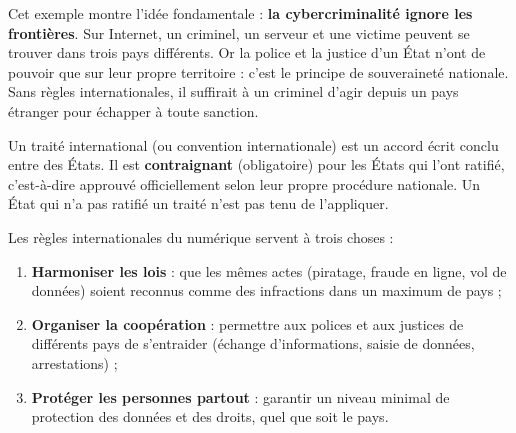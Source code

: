 \documentclass[11pt]{article}
\newcommand{\cle}[1]{{\popxbold\color{popdark}#1}}
\begin{document}
Cet exemple montre l'idée fondamentale : \textbf{la cybercriminalité ignore les frontières}. Sur Internet, un criminel, un serveur et une victime peuvent se trouver dans trois pays différents. Or la police et la justice d'un État n'ont de pouvoir que sur leur propre territoire : c'est le principe de \cle{souveraineté nationale}. Sans règles internationales, il suffirait à un criminel d'agir depuis un pays étranger pour échapper à toute sanction.

\begin{definition}
Un \cle{traité international} (ou \cle{convention internationale}) est un accord écrit conclu entre des États. Il est \textbf{contraignant} (obligatoire) pour les États qui l'ont \cle{ratifié}, c'est-à-dire approuvé officiellement selon leur propre procédure nationale. Un État qui n'a pas ratifié un traité n'est pas tenu de l'appliquer.
\end{definition}

\begin{aretenir}
Les règles internationales du numérique servent à trois choses :
\begin{enumerate}
\item \textbf{Harmoniser les lois} : que les mêmes actes (piratage, fraude en ligne, vol de données) soient reconnus comme des infractions dans un maximum de pays ;
\item \textbf{Organiser la coopération} : permettre aux polices et aux justices de différents pays de s'entraider (échange d'informations, saisie de données, arrestations) ;
\item \textbf{Protéger les personnes partout} : garantir un niveau minimal de protection des données et des droits, quel que soit le pays.
\end{enumerate}
\end{aretenir}
\end{document}
